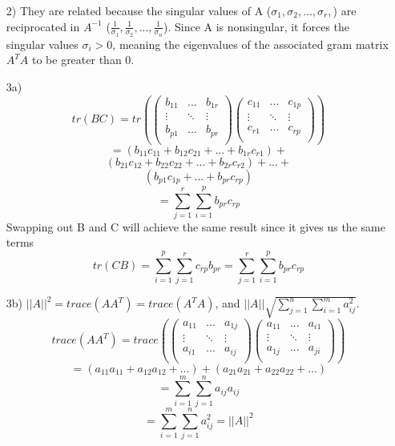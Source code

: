 \documentclass{article}
\begin{document}
\begin{enumerate}
    \item[2)] They are related because the singular values of A ($\sigma_1, \sigma_2, ..., \sigma_r, $) are reciprocated in $A^{-1}$ ($\frac{1}{\sigma_1}, \frac{1}{\sigma_2}, ..., \frac{1}{\sigma_n}$). Since A is nonsingular, it forces the singular values $\sigma_i > 0$, meaning the eigenvalues of the associated gram matrix $A^TA$ to be greater than 0.
    \item[3a)] $$tr(BC) = tr(\begin{pmatrix}
        b_{11} & ... & b_{1r} \\
        \vdots & \ddots & \vdots \\
        b_{p1} & ... &  b_{pr} \\
    \end{pmatrix}\begin{pmatrix}
        c_{11} & ... & c_{1p} \\
        \vdots & \ddots & \vdots \\
        c_{r1} & ... &  c_{rp} \\
    \end{pmatrix}) $$
                $$= (b_{11}c_{11} + b_{12}c_{21} + ... + b_{1r}c_{r1}) + $$$$ (b_{21}c_{12} + b_{22}c_{22} + ... + b_{2r}c_{r2}) + ... + $$$$ (b_{p1}c_{1p} + ... + b_{pr}c_{rp})$$
                $$= \sum_{j=1}^{r} \sum_{i=1}^{p} b_{pr}c_{rp} $$
                Swapping out B and C will achieve the same result since it gives us the same terms
                $$tr(CB) = \sum_{i=1}^{p} \sum_{j=1}^{r} c_{rp}b_{pr} = \sum_{j=1}^{r} \sum_{i=1}^{p} b_{pr}c_{rp}$$

    \item[3b)] $||A||^2 = trace(AA^T) = trace(A^TA)$, and $||A|| \sqrt{\sum_{j=1}^n \sum_{i=1}^m a_{ij}^2}$.
                $$ trace(AA^T) = trace(\begin{pmatrix}
                    a_{11} & ... & a_{1j} \\
                    \vdots & \ddots & \vdots \\
                    a_{i1} & ... &  a_{ij} \\
                \end{pmatrix}\begin{pmatrix}
                    a_{11} & ... & a_{i1} \\
                    \vdots & \ddots & \vdots \\
                    a_{1j} & ... &  a_{ji} \\
                \end{pmatrix})$$
                $$= (a_{11}a_11 + a_{12}a_12 + ...) + (a_{21}a_21 + a_{22}a_22 + ...)$$
                $$= \sum_{i=1}^{m} \sum_{j=1}^{n} a_{ij}a_{ij} $$
                $$= \sum_{i=1}^{m} \sum_{j=1}^{n} a_{ij}^2 = ||A||^2 $$


\end{enumerate}
\end{document}
